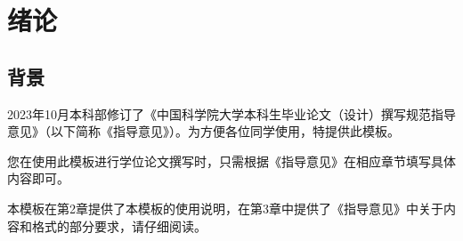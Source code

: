 \chapter{绪论}\label{chap:introduction}{

\section{背景}
2023年10月本科部修订了《中国科学院大学本科生毕业论文（设计）撰写规范指导意见》（以下简称《指导意见》）。为方便各位同学使用，特提供此模板。

您在使用此模板进行学位论文撰写时，只需根据《指导意见》在相应章节填写具体内容即可。

本模板在第2章提供了本模板的使用说明，在第3章中提供了《指导意见》中关于内容和格式的部分要求，请仔细阅读。


}
